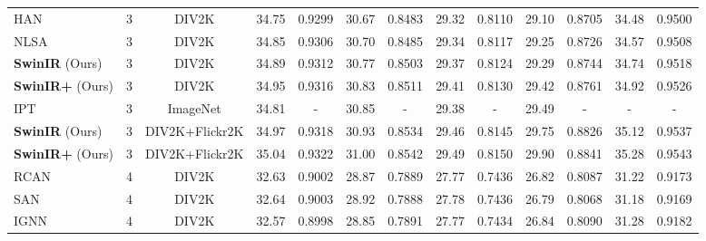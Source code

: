 \documentclass[10pt,twocolumn,letterpaper]{article}
\newcommand{\R}[1]{\textcolor[rgb]{1.00,0.00,0.00}{#1}}
\newcommand{\B}[1]{\textcolor[rgb]{0.00,0.00,1.00}{#1}}
\newcommand{\algname}{SwinIR}
\newlength \g
\begin{document}
\begin{table*}[t]
\begin{center}
\begin{tabular}{|l|c|c|c|c|c|c|c|c|c|c|c|c|}
HAN~\cite{niu2020HAN}  & 3   & DIV2K
& {34.75}
& {0.9299}
& {30.67}
& {0.8483}
& {29.32}
& {0.8110}
& {29.10}
& {0.8705}
& {34.48}
& {0.9500}
\\
NLSA~\cite{mei2021NLSA} & 3  & DIV2K
& 34.85 
& 0.9306 
& 30.70 
& 0.8485 
& 29.34 
& 0.8117 
& {29.25}
& {0.8726}
& 34.57 
& 0.9508
\\
\textbf{\algname{}} (Ours)  & 3  & DIV2K
& \B{34.89}
& \B{0.9312}
& \B{30.77}
& \B{0.8503}
& \B{29.37}
& \B{0.8124}
& \B{29.29}
& \B{0.8744}
& \B{34.74}
& \B{0.9518}
\\
\textbf{\algname{}+} (Ours)  & 3  & DIV2K
& \R{34.95}
& \R{0.9316}
& \R{30.83}
& \R{0.8511}
& \R{29.41}
& \R{0.8130}
& \R{29.42}
& \R{0.8761}
& \R{34.92}
& \R{0.9526}
\\
\hdashline
IPT~\cite{chen2021IPT} & 3  & ImageNet
& {34.81}
& {-}
& {30.85}
& {-}
& {29.38}
& {-}
& {29.49}
& {-}
& {-}
& {-}
\\
\textbf{\algname{}} (Ours)  & 3  & DIV2K+Flickr2K
& \B{34.97}
& \B{0.9318}
& \B{30.93}
& \B{0.8534}
& \B{29.46}
& \B{0.8145}
& \B{29.75}
& \B{0.8826}
& \B{35.12}
& \B{0.9537}
\\
\textbf{\algname{}+} (Ours)  & 3  & DIV2K+Flickr2K
& \R{35.04}
& \R{0.9322}
& \R{31.00}
& \R{0.8542}
& \R{29.49}
& \R{0.8150}
& \R{29.90}
& \R{0.8841}
& \R{35.28}
& \R{0.9543}
\\
\hline
\hline


RCAN~\cite{zhang2018rcan}& 4  & DIV2K
& {32.63}
& {0.9002}
& {28.87}
&{0.7889}
& {27.77}
& {0.7436}
&{26.82}
& {0.8087}
&{31.22}
& {0.9173}
\\ 
SAN~\cite{dai2019SAN} & 4  & DIV2K
& {32.64}
& {0.9003}
& {28.92}
& {0.7888}
& {27.78}
& {0.7436}
& {26.79}
& {0.8068}
& {31.18}
& {0.9169}
\\
IGNN~\cite{zhou2020IGNN}  & 4  & DIV2K
& {32.57}
& {0.8998}
& {28.85}
& {0.7891}
& {27.77}
& {0.7434}
& {26.84}
& {0.8090}
& {31.28}
& {0.9182}
\\


\end{tabular}
\end{center}
\end{table*}
\end{document}
